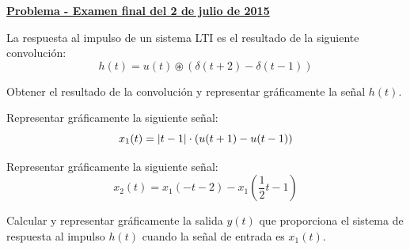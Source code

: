 \documentclass[a4paper]{book}
\begin{document}
\underline{\textbf{Problema  - Examen final del 2 de julio de 2015}}\\[\parskip]
\begin{myenumerate}
	La respuesta al impulso de un sistema LTI es el resultado de la siguiente convolución:
	\[h(t) = u(t) \circledast \left( \delta (t+2) - \delta (t-1) \right)\]
	\item  Obtener el resultado de la convolución y representar gráficamente la señal $h(t)$.
	\item Representar gráficamente la siguiente señal:
	\[x_1(t) = \abs{t-1}\cdot \left( u(t+1) - u(t-1) \right)\]

	\item Representar gráficamente la siguiente señal: \[x_2(t) = x_1(-t-2)-x_1\left( \frac{1}{2}t -1 \right)\]

	\item Calcular y representar gráficamente la salida $y(t)$ que proporciona el sistema de respuesta al impulso $h(t)$ cuando la señal de entrada es $x_1(t)$.
\end{myenumerate}
\end{document}
